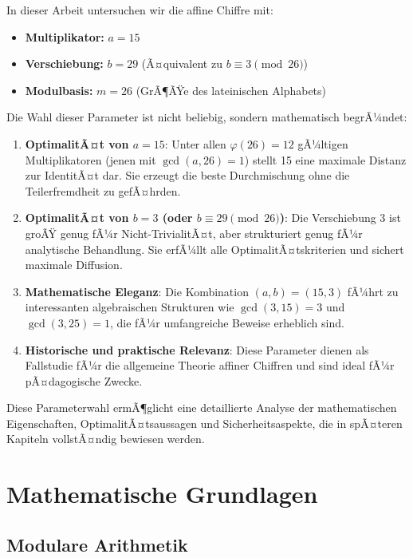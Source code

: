 ﻿\documentclass[12pt,a4paper]{article}
\begin{document}
	In dieser Arbeit untersuchen wir die affine Chiffre mit:
	\begin{itemize}
		\item \textbf{Multiplikator:} $a = 15$
		\item \textbf{Verschiebung:} $b = 29$ (Ã¤quivalent zu $b \equiv 3 \pmod{26}$)
		\item \textbf{Modulbasis:} $m = 26$ (GrÃ¶ÃŸe des lateinischen Alphabets)
	\end{itemize}
	
	Die Wahl dieser Parameter ist nicht beliebig, sondern mathematisch begrÃ¼ndet:
	
	\begin{enumerate}
		\item \textbf{OptimalitÃ¤t von $a = 15$}: Unter allen $\varphi(26) = 12$ gÃ¼ltigen Multiplikatoren (jenen mit $\gcd(a, 26) = 1$) stellt 15 eine maximale Distanz zur IdentitÃ¤t dar. Sie erzeugt die beste Durchmischung ohne die Teilerfremdheit zu gefÃ¤hrden.
		
		\item \textbf{OptimalitÃ¤t von $b = 3$ (oder $b \equiv 29 \pmod{26}$)}: Die Verschiebung 3 ist groÃŸ genug fÃ¼r Nicht-TrivialitÃ¤t, aber strukturiert genug fÃ¼r analytische Behandlung. Sie erfÃ¼llt alle OptimalitÃ¤tskriterien und sichert maximale Diffusion.
		
		\item \textbf{Mathematische Eleganz}: Die Kombination $(a, b) = (15, 3)$ fÃ¼hrt zu interessanten algebraischen Strukturen wie $\gcd(3, 15) = 3$ und $\gcd(3, 25) = 1$, die fÃ¼r umfangreiche Beweise erheblich sind.
		
		\item \textbf{Historische und praktische Relevanz}: Diese Parameter dienen als Fallstudie fÃ¼r 
		die allgemeine Theorie affiner Chiffren und sind ideal fÃ¼r pÃ¤dagogische Zwecke.
	\end{enumerate}
	
	Diese Parameterwahl ermÃ¶glicht eine detaillierte Analyse der mathematischen Eigenschaften, 
	OptimalitÃ¤tsaussagen und Sicherheitsaspekte, die in spÃ¤teren Kapiteln vollstÃ¤ndig bewiesen werden.
	
	\section{Mathematische Grundlagen}
	
	\subsection{Modulare Arithmetik}
	
\end{document}
